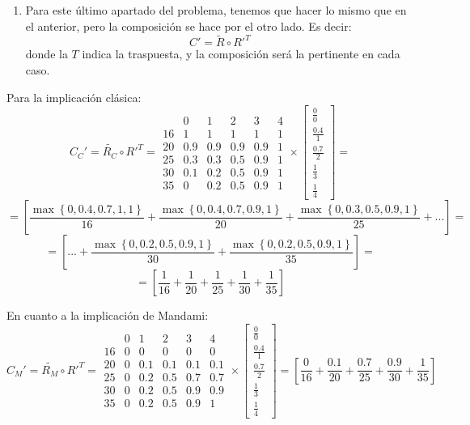 \documentclass[
]{article}
\providecommand{\tightlist}{%
  \setlength{\itemsep}{0pt}\setlength{\parskip}{0pt}}
\begin{document}
\begin{enumerate}
\def\labelenumi{\arabic{enumi}.}
\setcounter{enumi}{2}
\tightlist
\item
  Para este último apartado del problema, tenemos que hacer lo mismo que
  en el anterior, pero la composición se hace por el otro lado. Es
  decir: \[C'=\widetilde{R}\circ R'^{T}\] donde la \(T\) indica la
  traspuesta, y la composición será la pertinente en cada caso.
\end{enumerate}

Para la implicación clásica:
\[C_{C}'=\widetilde{R_{C}}\circ R'^{T}=\begin{array}{cccccc}
 & 0 & 1 & 2 & 3 & 4\\
16 & 1 & 1 & 1 & 1 & 1\\
20 & 0.9 & 0.9 & 0.9 & 0.9 & 1\\
25 & 0.3 & 0.3 & 0.5 & 0.9 & 1\\
30 & 0.1 & 0.2 & 0.5 & 0.9 & 1\\
35 & 0 & 0.2 & 0.5 & 0.9 & 1
\end{array}\times\left[\begin{array}{c}
\frac{0}{0}\\
\frac{0.4}{1}\\
\frac{0.7}{2}\\
\frac{1}{3}\\
\frac{1}{4}
\end{array}\right]=\]
\[=\left[\frac{\max\left\{ 0,0.4,0.7,1,1\right\} }{16}+\frac{\max\left\{ 0,0.4,0.7,0.9,1\right\} }{20}+\frac{\max\left\{ 0,0.3,0.5,0.9,1\right\} }{25}+...\right]=\]
\[=\left[...+\frac{\max\left\{ 0,0.2,0.5,0.9,1\right\} }{30}+\frac{\max\left\{ 0,0.2,0.5,0.9,1\right\} }{35}\right]=\]
\[=\left[\frac{1}{16}+\frac{1}{20}+\frac{1}{25}+\frac{1}{30}+\frac{1}{35}\right]\]

En cuanto a la implicación de Mandami:
\[C_{M}'=\widetilde{R_{M}}\circ R'^{T}=\begin{array}{cccccc}
 & 0 & 1 & 2 & 3 & 4\\
16 & 0 & 0 & 0 & 0 & 0\\
20 & 0 & 0.1 & 0.1 & 0.1 & 0.1\\
25 & 0 & 0.2 & 0.5 & 0.7 & 0.7\\
30 & 0 & 0.2 & 0.5 & 0.9 & 0.9\\
35 & 0 & 0.2 & 0.5 & 0.9 & 1
\end{array}\times\left[\begin{array}{c}
\frac{0}{0}\\
\frac{0.4}{1}\\
\frac{0.7}{2}\\
\frac{1}{3}\\
\frac{1}{4}
\end{array}\right]=\left[\frac{0}{16}+\frac{0.1}{20}+\frac{0.7}{25}+\frac{0.9}{30}+\frac{1}{35}\right]\]
\end{document}
